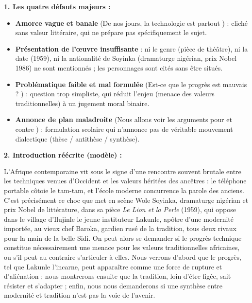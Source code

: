 \documentclass[11pt]{article}
\begin{document}
\begin{corrige}
\textbf{1. Les quatre défauts majeurs :}
\begin{itemize}
\item \textbf{Amorce vague et banale} (\og De nos jours, la technologie est partout \fg) : cliché sans valeur littéraire, qui ne prépare pas spécifiquement le sujet.
\item \textbf{Présentation de l'œuvre insuffisante} : ni le genre (pièce de théâtre), ni la date (1959), ni la nationalité de Soyinka (dramaturge nigérian, prix Nobel 1986) ne sont mentionnés ; les personnages sont cités sans être situés.
\item \textbf{Problématique faible et mal formulée} (\og Est-ce que le progrès est mauvais ? \fg) : question trop simpliste, qui réduit l'enjeu (menace des valeurs traditionnelles) à un jugement moral binaire.
\item \textbf{Annonce de plan maladroite} (\og Nous allons voir les arguments pour et contre \fg) : formulation scolaire qui n'annonce pas de véritable mouvement dialectique (thèse / antithèse / synthèse).
\end{itemize}

\textbf{2. Introduction réécrite (modèle) :}

\og L'Afrique contemporaine vit sous le signe d'une rencontre souvent brutale entre les techniques venues d'Occident et les valeurs héritées des ancêtres : le téléphone portable côtoie le tam-tam, et l'école moderne concurrence la parole des anciens. C'est précisément ce choc que met en scène Wole Soyinka, dramaturge nigérian et prix Nobel de littérature, dans sa pièce \emph{Le Lion et la Perle} (1959), qui oppose dans le village d'Ilujinle le jeune instituteur Lakunle, apôtre d'une modernité importée, au vieux chef Baroka, gardien rusé de la tradition, tous deux rivaux pour la main de la belle Sidi. On peut alors se demander si le progrès technique constitue nécessairement une menace pour les valeurs traditionnelles africaines, ou s'il peut au contraire s'articuler à elles. Nous verrons d'abord que le progrès, tel que Lakunle l'incarne, peut apparaître comme une force de rupture et d'aliénation ; nous montrerons ensuite que la tradition, loin d'être figée, sait résister et s'adapter ; enfin, nous nous demanderons si une synthèse entre modernité et tradition n'est pas la voie de l'avenir. \fg


\end{corrige}
\end{document}
